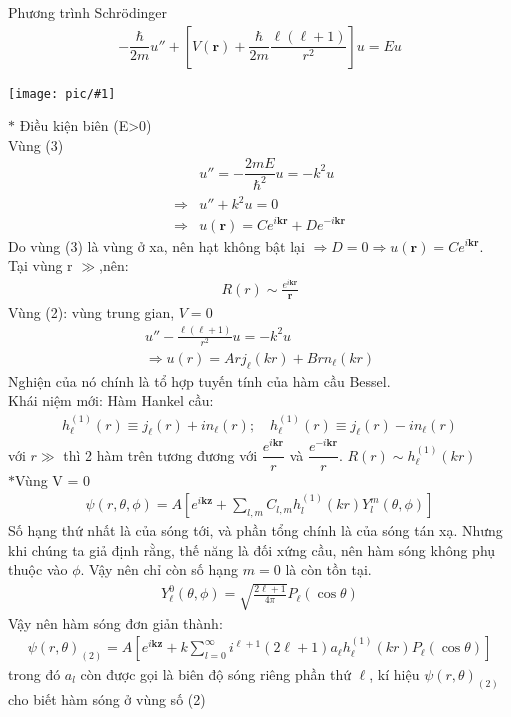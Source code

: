 \documentclass{report}
\newcommand{\image}[1]{
	\begin{center}
		\texttt{[image: pic/\#1]}
	\end{center}
}
\renewcommand{\l}{\ell}
\begin{document}
Phương trình Schr\"{o}dinger
\begin{align*}
	-\dfrac{\hbar}{2m}u'' + \left[V(\mathbf{r})+ \dfrac{\hbar}{2m}\dfrac{\l(\l+1)}{r^2}\right]u = Eu
\end{align*}
\image{zone.png}
$\ast$ Điều kiện biên (E>0)\\
Vùng (3)
\begin{align*}
	            & u'' = -\dfrac{2mE}{\hbar^2}u = -k^2u                \\
	\Rightarrow & u'' + k^2u =0                                       \\
	\Rightarrow & u(\mathbf{r})=Ce^{i\mathbf{kr}} +De^{-i\mathbf{kr}}
\end{align*}
Do vùng (3) là vùng ở xa, nên hạt không bật lại $\Rightarrow D = 0 $$\Rightarrow u(\mathbf{r})=Ce^{i\mathbf{kr}}$.\\
			Tại vùng r $\gg$,nên:
			\begin{align*}
				R(r) \sim \frac{e^{i\mathbf{kr}}}{\mathbf{r}}
			\end{align*}
			Vùng (2): vùng trung gian, $V=0$
			\begin{align*}
				u'' - \frac{\l(\l+1)}{r^2}u = -k^2u \\
				\Rightarrow u(r) = Arj_{\l}(kr)+  Brn_{\l}(kr)
			\end{align*}
			Nghiện của nó chính là tổ hợp tuyến tính của hàm cầu Bessel.\\
			Khái niệm mới: Hàm Hankel cầu:
			\begin{align}
				h_{\l}^{(1)}(r) \equiv j_{\l}(r) + in_{\l}(r); \quad h_{\l}^{(1)}(r) \equiv j_{\l}(r) - in_{\l}(r)
			\end{align}\label{eq1.3}
			với $r \gg$ thì 2 hàm trên tương đương với $\dfrac{e^{i\mathbf{kr}}}{r}$ và $\dfrac{e^{-i\mathbf{kr}}}{r}$. $R(r)\sim h_{\l}^{(1)}(kr)$\\
		$\ast$Vùng V = 0
			\begin{align*}
				\psi(r,\theta,\phi) = A \left[e^{i\mathbf{kz}} + \sum_{l,m}C_{l,m} h_l^{(1)}(kr) Y_l^m(\theta,\phi)  \right]
			\end{align*}
			Số hạng thứ nhất là của sóng tới, và phần tổng chính là của sóng tán xạ. Nhưng khi chúng ta giả định rằng, thế năng là đối xứng cầu, nên hàm sóng không phụ thuộc vào $\phi$. Vậy nên chỉ còn số hạng $m=0$ là còn tồn tại.
			\begin{align*}
				Y_{\l}^0 (\theta,\phi) = \sqrt{\frac{2\l+1}{4\pi}}P_{\l}(\cos\theta)
			\end{align*}
			Vậy nên hàm sóng đơn giản thành:
			\begin{align*}
				\psi(r,\theta)_{(2)} = A \left[e^{i\mathbf{kz}} + k\sum_{l=0}^{\infty}i^{\l+1}(2\l+1)a_{\l} h_{\l}^{(1)}(kr) P_{\l}(\cos\theta)\right]
			\end{align*}
			trong đó $a_l$ còn được gọi là biên độ sóng riêng phần thứ $\l$, kí hiệu $\psi(r,\theta)_{(2)}$ cho biết hàm sóng ở vùng số (2)
\end{document}
